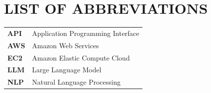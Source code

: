 \clearpage
{}
{}
\chapter*{LIST OF ABBREVIATIONS}

\begin{center}
\begin{tabular}{@{}p{3cm}p{11.5cm}@{}}
  \textbf{API} & Application Programming Interface \\
  \textbf{AWS} & Amazon Web Services \\
  \textbf{EC2} & Amazon Elastic Compute Cloud \\
  \textbf{LLM} & Large Language Model \\
  \textbf{NLP} & Natural Language Processing \\
\end{tabular}
\end{center}
